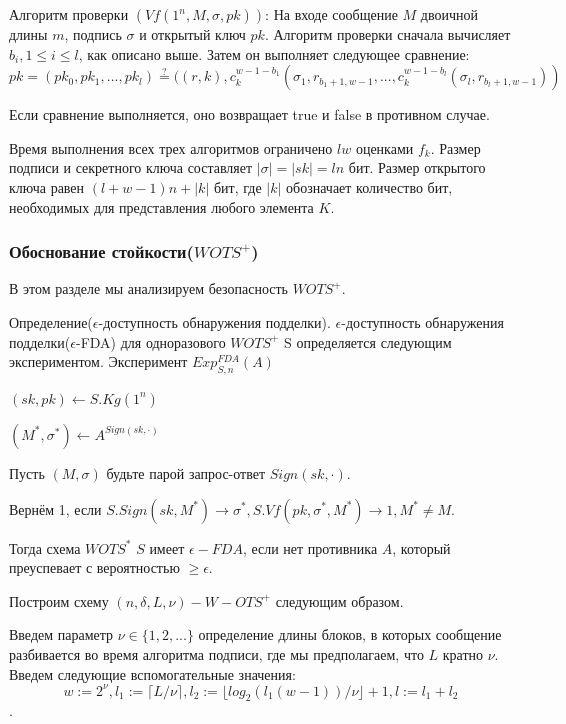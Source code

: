 \documentclass[a4paper, 14pt]{extarticle}
\begin{document}
Алгоритм проверки $(Vf(1^n, M, \sigma, pk))$: На входе сообщение $M$ двоичной длины $m$, подпись $\sigma$ и открытый ключ $pk$. Алгоритм проверки сначала вычисляет $b_{i}, 1 \leq i \leq l$, как описано выше. Затем он выполняет следующее сравнение:
\[ pk = (pk_{0}, pk_{1}, ..., pk_{l}) \stackrel{?}{=} ((r,k),c^{w - 1 - b_{1}}_{k}(\sigma_{1}, r_{b_{1} + 1, w - 1}, ..., c^{w - 1 - b_{l}}_{k}(\sigma_{l}, r_{b_{l} + 1, w - 1})) \]

Если сравнение выполняется, оно возвращает true и false в противном случае.

Время выполнения всех трех алгоритмов ограничено $lw$ оценками $f_{k}$. Размер подписи и секретного ключа составляет $|\sigma| = |sk| = ln$ бит. Размер открытого ключа равен $(l + w - 1)n + |k|$ бит, где $|k|$ обозначает количество бит, необходимых для представления любого элемента $K$.
\subsubsection{Обоснование стойкости($WOTS^{+}$)}
В этом разделе мы анализируем безопасность $WOTS^{+}$.

Определение($\epsilon$-доступность обнаружения подделки). $\epsilon$-доступность обнаружения подделки($\epsilon$-FDA) для одноразового $WOTS^{+}$ S определяется следующим экспериментом.
\newpage
Эксперимент $Exp^{F D A}_{S,n}(A)$

\hspace{10mm} $(sk, pk) \leftarrow S.Kg(1^n)$

\hspace{10mm} $(M^{*}, \sigma^{*}) \leftarrow A^{Sign(sk,\cdot)}$

Пусть $(M, \sigma)$ будьте парой запрос-ответ $Sign(sk,\cdot)$.

Вернём 1, если $S.Sign(sk, M^{*}) \rightarrow \sigma^{*}, S.Vf(pk, \sigma^{*}, M^{*}) \rightarrow 1, M^{*} \neq M$.

Тогда схема $WOTS^{*}$ $S$ имеет $\epsilon-FDA$, если нет противника $A$, который преуспевает с вероятностью $\geq \epsilon$.

Построим схему $(n, \delta, L, \nu)-W-OTS^{+}$ следующим образом.

Введем параметр $\nu \in \{1, 2, ...\}$ определение длины блоков, в которых сообщение разбивается во время алгоритма подписи, где мы предполагаем, что $L$ кратно $\nu$. Введем следующие вспомогательные значения:
\[w := 2^{\nu}, l_{1} := \lceil L/\nu \rceil, l_{2} := \lfloor log_{2}(l_{1}(w - 1))/\nu \rfloor + 1, l := l_{1} + l_{2}\].
\end{document}
